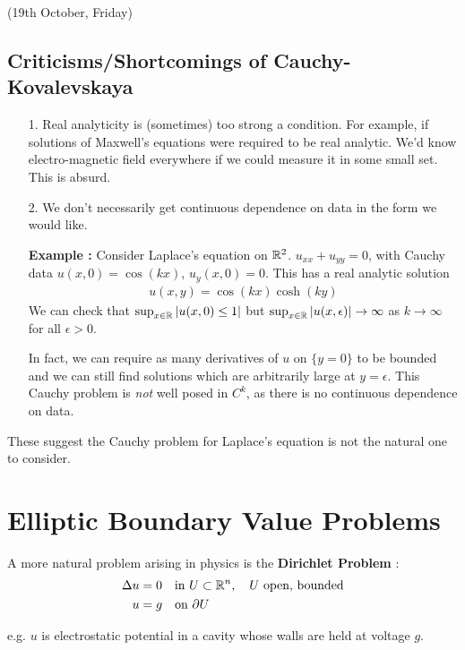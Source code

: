 \documentclass[12pt,a4paper]{report}
\begin{document}
\newday

(19th October, Friday)
\s

\subsection*{Criticisms/Shortcomings of Cauchy-Kovalevskaya}
\begin{itemize}
\item[1.] Real analyticity is (sometimes) too strong a condition. For example, if solutions of Maxwell's equations were required to be real analytic. We'd know electro-magnetic field everywhere if we could measure it in some small set. This is absurd.
\item[2.] We don't necessarily get continuous dependence on data in the form we would like.

\textbf{Example :} Consider Laplace's equation on $\mathbb{R}^2$. $u_{xx} + u_{yy} = 0$, with Cauchy data $u(x,0) = \cos (kx)$, $u_y(x,0) =0$. This has a real analytic solution
\begin{align*}
u(x,y) = \cos (kx) \cosh (ky)
\end{align*}
We can check that $\sup_{x\in \mathbb{R}} |u(x,0) \leq 1|$ but $\sup_{x\in \mathbb{R}} |u(x,\epsilon)| \rightarrow \infty$ as $k\rightarrow \infty$ for all $\epsilon >0$.

\quad In fact, we can require as many derivatives of $u$ on $\{ y=0 \}$ to be bounded and we can still find solutions which are arbitrarily large at $y=\epsilon$. This Cauchy problem is \emph{not} well posed in $C^k$, as there is no continuous dependence on data.
\s
\end{itemize}
\s

These suggest the Cauchy problem for Laplace's equation is not the natural one to consider. 

\section*{Elliptic Boundary Value Problems}

A more natural problem arising in physics is the \textbf{Dirichlet Problem} : 
\begin{align*}
\Delta u &= 0\quad \text{in } U\subset \mathbb{R}^n, \quad U \text{ open, bounded} \\
u &= g \quad \text{on } \partial U
\end{align*}

e.g. $u$ is electrostatic potential in a cavity whose walls are held at voltage $g$. 
\s
\end{document}
